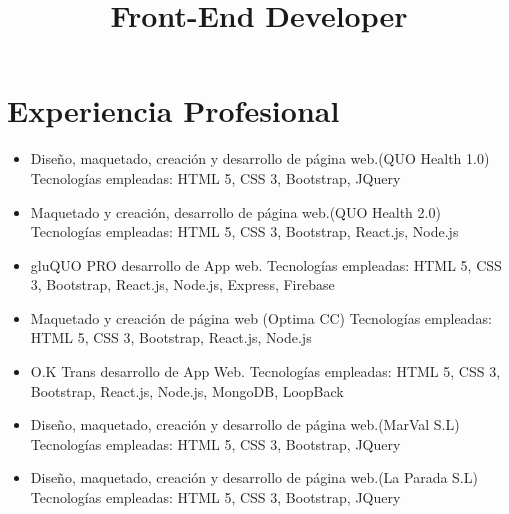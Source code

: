 \documentclass[11pt,a4paper]{moderncv}
\title{Front-End Developer}
\begin{document}
\maketitle
\section{Experiencia Profesional}
{\begin{itemize}
\item Diseño, maquetado, creación y desarrollo de página web.(QUO Health 1.0) Tecnologías empleadas: HTML 5, CSS 3, Bootstrap, JQuery
\end{itemize}
\begin{itemize}
\item Maquetado y creación, desarrollo de página web.(QUO Health 2.0) Tecnologías empleadas: HTML 5, CSS 3, Bootstrap, React.js, Node.js
\end{itemize}
\begin{itemize}
\item gluQUO PRO desarrollo de App web. Tecnologías empleadas: HTML 5, CSS 3, Bootstrap, React.js, Node.js, Express, Firebase
\end{itemize}
\begin{itemize}
\item Maquetado y creación de página web (Optima CC) Tecnologías empleadas: HTML 5, CSS 3, Bootstrap, React.js, Node.js
\end{itemize}
\begin{itemize}
\item O.K Trans desarrollo de App Web. Tecnologías empleadas: HTML 5, CSS 3, Bootstrap, React.js, Node.js, MongoDB, LoopBack
\end{itemize}
}
{
\begin{itemize}
\item Diseño, maquetado, creación y desarrollo de página web.(MarVal S.L) Tecnologías empleadas: HTML 5, CSS 3, Bootstrap, JQuery
\end{itemize}
\begin{itemize}
\item Diseño, maquetado, creación y desarrollo de página web.(La Parada S.L) Tecnologías empleadas: HTML 5, CSS 3, Bootstrap, JQuery
\end{itemize}
}
\end{document}
